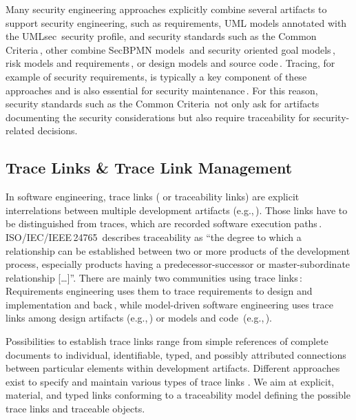 Many security engineering approaches explicitly combine several artifacts to support security engineering, such as requirements, UML models annotated with the UMLsec\,\cite{jurjens2005secure} security profile, and security standards such as the Common Criteria\,\cite{houmb2010eliciting}, other combine
SecBPMN models\,\cite{Salnitri2017DSB} and security oriented goal models\,\cite{Salnitri2020},
risk models and requirements\,\cite{5507389}, or design models and source code\,\cite{Peldszus2022}.
Tracing, for example of security requirements, is typically a key component of these approaches and is also essential for security maintenance\,\cite{Yu2008}.
For this reason, security standards such as the Common Criteria\,\cite{cc} not only ask for artifacts documenting the security considerations but also require traceability for security-related decisions.


\subsection{Trace Links \& Trace Link Management}
\label{sec:background:tracelinks}
In software engineering, trace links (%
or
traceability links)  are explicit interrelations between multiple development artifacts (e.g.,\,\cite{schwarz2010gbt}).
Those links have to be distinguished from traces, which are recorded software execution paths\,\cite{Praehofer2014,Hendriks2016}. ISO/IEC/IEEE\,24765\,\cite{ISO24765:2010} describes traceability as \enquote{the degree to which a relationship can be established between two or more products of the development process, especially products having a predecessor-successor or master-subordinate relationship %
[\dots]}. There are mainly two communities using trace links\,\cite{winkler2010survey}: %
Requirements engineering %
uses %
them
to trace requirements to design and implementation and back\,\cite{Gotel1994Trace,Pinheiro2004trace}, while model-driven software engineering uses trace links among design artifacts (e.g.,\,\cite{Mouratidis2010GDS,Ahmadian2017MBP}) or models and code~(e.g.,\,\cite{Peldszus2019SDF}).

Possibilities to establish trace links range from simple references of complete documents to individual, identifiable, typed, and possibly attributed connections between particular elements within development artifacts. %
Different approaches exist to specify and maintain \cite{winkler2010survey} various types of trace links %
\cite{spanoudakis2005software,Espinoza2006ASC}.
We aim at explicit, material, and typed links conforming to a traceability model \cite{Pinheiro2004trace,schwarz2010gbt,Grosser2022RDR} defining the possible trace links and traceable objects.

